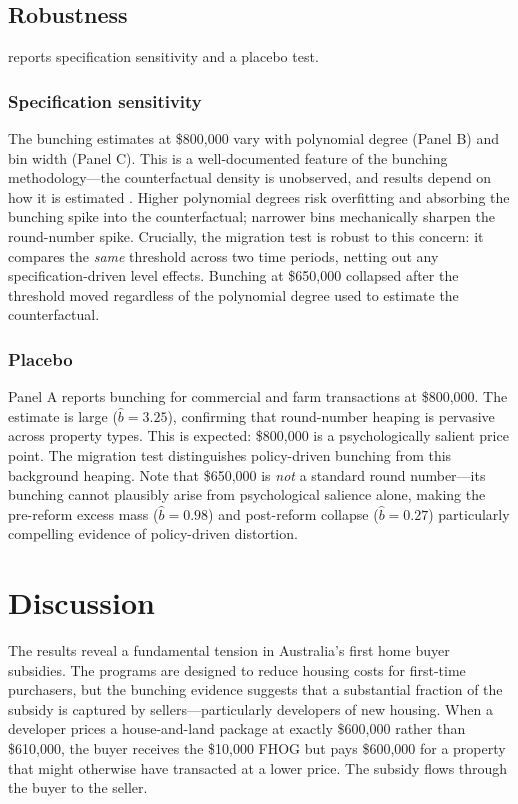\documentclass[12pt]{article}
\begin{document}



\subsection{Robustness}

 reports specification sensitivity and a placebo test.

\subsubsection*{Specification sensitivity} The bunching estimates at \$800,000 vary with polynomial degree (Panel B) and bin width (Panel C). This is a well-documented feature of the bunching methodology---the counterfactual density is unobserved, and results depend on how it is estimated \citep{kleven2016bunching}. Higher polynomial degrees risk overfitting and absorbing the bunching spike into the counterfactual; narrower bins mechanically sharpen the round-number spike. Crucially, the migration test is robust to this concern: it compares the \textit{same} threshold across two time periods, netting out any specification-driven level effects. Bunching at \$650,000 collapsed after the threshold moved regardless of the polynomial degree used to estimate the counterfactual.

\subsubsection*{Placebo} Panel A reports bunching for commercial and farm transactions at \$800,000. The estimate is large ($\hat{b} = 3.25$), confirming that round-number heaping is pervasive across property types. This is expected: \$800,000 is a psychologically salient price point. The migration test distinguishes policy-driven bunching from this background heaping. Note that \$650,000 is \textit{not} a standard round number---its bunching cannot plausibly arise from psychological salience alone, making the pre-reform excess mass ($\hat{b} = 0.98$) and post-reform collapse ($\hat{b} = 0.27$) particularly compelling evidence of policy-driven distortion.




\section{Discussion}

The results reveal a fundamental tension in Australia's first home buyer subsidies. The programs are designed to reduce housing costs for first-time purchasers, but the bunching evidence suggests that a substantial fraction of the subsidy is captured by sellers---particularly developers of new housing. When a developer prices a house-and-land package at exactly \$600,000 rather than \$610,000, the buyer receives the \$10,000 FHOG but pays \$600,000 for a property that might otherwise have transacted at a lower price. The subsidy flows through the buyer to the seller.
\end{document}
